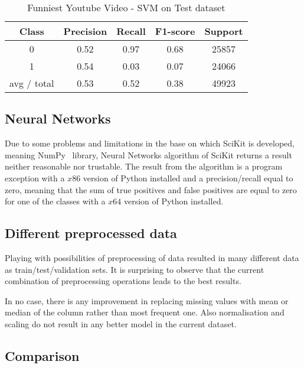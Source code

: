 \begin{table}[p]
\begin{center}
\begin{tabular}{|c|c|c|c|c|}
\hline Class & Precision & Recall & F1-score & Support \\

\hline 0 & 0.52 & 0.97 & 0.68 & 25857\\
\hline 1 & 0.54 & 0.03 & 0.07 & 24066\\
\hline avg / total & 0.53 & 0.52 & 0.38 & 49923\\
\hline
\end{tabular}

\caption{Funniest Youtube Video - SVM on Test dataset}
\label{table:ds3:svm-test}
\end{center}
\end{table}


\subsection{Neural Networks}

Due to some problems and limitations in the base on which SciKit is developed,
meaning NumPy~\cite{} library, Neural Networks algorithm of SciKit returns
a result neither reasonable nor trustable. The result from the algorithm is a
program exception with a $x86$ version of Python installed and a
precision/recall equal to zero, meaning that the sum of true positives and false
positives are equal to zero for one of the
classes with a $x64$ version of Python installed.


\subsection{Different preprocessed data}

Playing with possibilities of preprocessing of data resulted in many different
data as train/test/validation sets. It is surprising to observe that the current
combination of preprocessing operations leads to the best results. 

In no case, there is any improvement in replacing missing values with mean or
median of the column rather than most frequent one. Also normalisation and
scaling do not result in any better model in the current dataset.

\subsection{Comparison}


